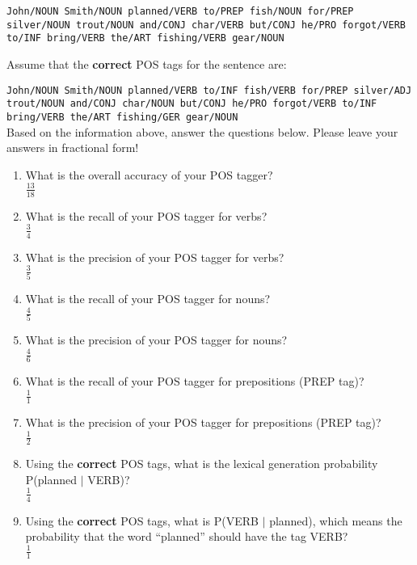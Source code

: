 \documentclass[11pt]{article}
\begin{document}
\begin{enumerate}
{\tt John/NOUN Smith/NOUN planned/VERB to/PREP fish/NOUN for/PREP silver/NOUN trout/NOUN
and/CONJ char/VERB but/CONJ he/PRO forgot/VERB to/INF bring/VERB the/ART fishing/VERB gear/NOUN}

Assume that the {\bf correct} POS tags for the sentence are:

{\tt John/NOUN Smith/NOUN planned/VERB to/INF fish/VERB for/PREP silver/ADJ
trout/NOUN and/CONJ char/NOUN but/CONJ he/PRO forgot/VERB to/INF
bring/VERB the/ART fishing/GER gear/NOUN} \\

Based on the information above, answer the questions below. Please
leave your answers in fractional form!

\begin{enumerate}

\item What is the overall accuracy of your POS tagger?\\
$\frac{13}{18}$ 


\item What is the recall of your POS tagger for verbs?\\
$\frac{3}{4}$ 

\item What is the precision of your POS tagger for verbs?\\
$\frac{3}{5}$ 

\item What is the recall of your POS tagger for nouns?\\
$\frac{4}{5}$ 

\item What is the precision of your POS tagger for nouns?\\
$\frac{4}{6}$ 

\item What is the recall of your POS tagger for prepositions (PREP tag)? \\
$\frac{1}{1}$ 

\item What is the precision of your POS tagger for prepositions (PREP tag)?\\
$\frac{1}{2}$ 

\item Using the \textbf{correct} POS tags, what is the lexical
  generation probability P(planned $\mid$ VERB)?\\
$\frac{1}{4}$ 
\item Using the \textbf{correct} POS tags, what is P(VERB $\mid$
  planned), which means the probability that the word ``planned''
  should have the tag VERB?\\
  $\frac{1}{1}$ 


\end{enumerate}
\end{enumerate}
\end{document}
